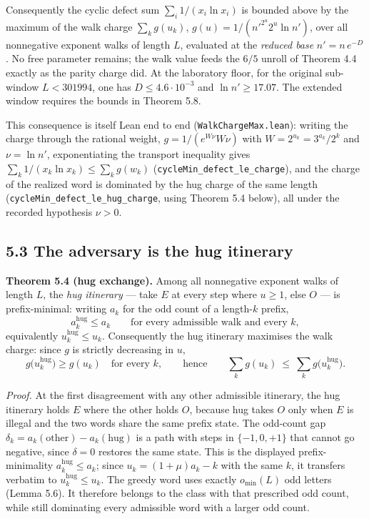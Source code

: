 \documentclass[12pt]{article}
\begin{document}
Consequently the cyclic defect sum \(\sum_i 1/(x_i\ln x_i)\) is bounded
above by the maximum of the walk charge \(\sum_k g(u_k)\),
\(g(u)=1/(n'^{2^u}2^u\ln n')\), over all nonnegative exponent walks of
length \(L\), evaluated at the \emph{reduced base} \(n'=n\,e^{-D}\). No
free parameter remains; the walk value feeds the \(6/5\) unroll of
Theorem 4.4 exactly as the parity charge did. At the laboratory floor,
for the original sub-window \(L<301994\), one has
\(D\le4.6\cdot10^{-3}\) and \(\ln n'\ge17.07\). The extended window
requires the bounds in Theorem 5.8.

This consequence is itself Lean end to end
(\texttt{\nolinkurl{WalkChargeMax.lean}}): writing the charge through
the rational weight, \(g=1/(e^{W\nu}W\nu)\) with
\(W=2^{u_k}=3^{a_k}/2^k\) and \(\nu=\ln n'\), exponentiating the
transport inequality gives \(\sum_k 1/(x_k\ln x_k)\le\sum_k g(w_k)\)
(\texttt{\nolinkurl{cycleMin_defect_le_charge}}), and the charge of the
realized word is dominated by the hug charge of the same length
(\texttt{\nolinkurl{cycleMin_defect_le_hug_charge}}, using Theorem 5.4
below), all under the recorded hypothesis \(\nu>0\).

\subsection{5.3 The adversary is the hug
itinerary}\label{the-adversary-is-the-hug-itinerary}

\textbf{Theorem 5.4 (hug exchange).} Among all nonnegative exponent
walks of length \(L\), the \emph{hug itinerary} --- take \(E\) at every
step where \(u\ge 1\), else \(O\) --- is prefix-minimal: writing \(a_k\)
for the odd count of a length-\(k\) prefix, \[
a_k^{\mathrm{hug}}\le a_k
\qquad\text{for every admissible walk and every }k,
\] equivalently \(u_k^{\mathrm{hug}}\le u_k\). Consequently the hug
itinerary maximises the walk charge: since \(g\) is strictly decreasing
in \(u\), \[
g\bigl(u_k^{\mathrm{hug}}\bigr)\ge g(u_k)
\quad\text{for every }k,
\qquad\text{hence}\qquad
\sum_{k}g(u_k)\ \le\ \sum_{k}g\bigl(u_k^{\mathrm{hug}}\bigr).
\]

\emph{Proof.} At the first disagreement with any other admissible
itinerary, the hug itinerary holds \(E\) where the other holds \(O\),
because hug takes \(O\) only when \(E\) is illegal and the two words
share the same prefix state. The odd-count gap
\(\delta_k=a_k(\text{other})-a_k(\text{hug})\) is a path with steps in
\(\{-1,0,+1\}\) that cannot go negative, since \(\delta=0\) restores the
same state. This is the displayed prefix-minimality
\(a_k^{\mathrm{hug}}\le a_k\); since \(u_k=(1+\mu)a_k-k\) with the same
\(k\), it transfers verbatim to \(u_k^{\mathrm{hug}}\le u_k\). The
greedy word uses exactly \(o_{\min}(L)\) odd letters (Lemma 5.6). It
therefore belongs to the class with that prescribed odd count, while
still dominating every admissible word with a larger odd count.
\end{document}
